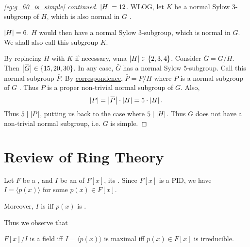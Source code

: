 \documentclass[notoc,notitlepage]{tufte-book}
\begin{document}
\begin{proof}[\cref{eg:g_60_is_simple} continued]
   $\left|H\right| = 12$. WLOG, let $K$ be a normal Sylow $3$-subgroup
  of $H$, which is also normal in $G$ .

  \noindent
   $\left|H\right| = 6$. $H$ would then have a normal Sylow $3$-subgroup,
  which is normal in $G$. We shall also call this subgroup $K$.

  \noindent
  By replacing $H$ with $K$ if necessary, wma $\left| H \right| \in \left\{ 2, 3, 4 \right\}$.
  Consider $\bar{G} = G / H$. Then $\abs{ \bar{G} } \in \left\{ 15, 20, 30 \right\}$.
  In any case, $\bar{G}$ has a normal Sylow $5$-subgroup. Call this normal subgroup 
  $\bar{P}$. By \hyperref[thm:correspondence_theorem]{correspondence}, $\bar{P} = P / H$
  where $P$ is a normal subgroup of $G$ . Thus $P$ is a proper non-trivial normal subgroup of $G$.
  Also,
  \begin{equation*}
    \abs{ P } = \abs{ \bar{P} } \cdot \abs{ H } = 5 \cdot \abs{ H }.
  \end{equation*}
  Thus $5 \mid \left| P \right|$, putting us back to the case where $5 \mid \left| H \right|$.
  Thus $G$ does not have a non-trivial normal subgroup, i.e. $G$ is simple.
\end{proof}


\section{Review of Ring Theory}%
\label{sec:review_of_ring_theory}

Let $F$ be a , and $I$ be an  of $F[x]$, its
. Since $F[x]$ is a PID, we have $I = \langle p(x) \rangle$
for some $p(x) \in F[x]$.

Moreover, $I$ is  iff $p(x)$ is .

Thus we observe that
\begin{center}
  $F[x]/I$ is a field iff $I = \langle p(x) \rangle$ is maximal iff $p(x) \in F[x]$ is irreducible.
\end{center}
\end{document}
